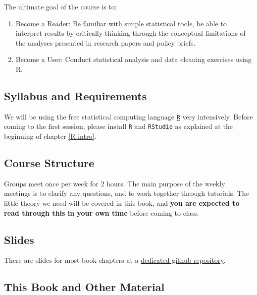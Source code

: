 \documentclass[]{book}
\begin{document}
The ultimate goal of the course is to:

\begin{enumerate}
\def\labelenumi{\arabic{enumi}.}
\item
  Become a Reader: Be familiar with simple statistical tools, be able to interpret results by critically thinking through the conceptual limitations of the analyses presented in research papers and policy briefs. 
\item
  Become a User: Conduct statistical analysis and data cleaning exercises using R.
\end{enumerate}

\hypertarget{syllabus-and-requirements}{%
\subsection*{Syllabus and Requirements}\label{syllabus-and-requirements}}

We will be using the free statistical computing language \href{https://www.r-project.org}{\texttt{R}} very intensively. Before coming to the first session, please install \texttt{R} and \texttt{RStudio} as explained at the beginning of chapter \ref{R-intro}.

\hypertarget{course-structure}{%
\subsection*{Course Structure}\label{course-structure}}

Groups meet once per week for 2 hours. The main purpose of the weekly meetings is to clarify any questions, and to work together through tutorials. The little theory we need will be covered in this book, and \textbf{you are expected to read through this in your own time} before coming to class.

\hypertarget{slides}{%
\subsection*{Slides}\label{slides}}

There are slides for most book chapters at a \href{https://michelefioretti.github.io/ScPoEconometrics-Slides/}{dedicated github repository}.

\hypertarget{this-book-and-other-material}{%
\subsection*{This Book and Other Material}\label{this-book-and-other-material}}
\end{document}
